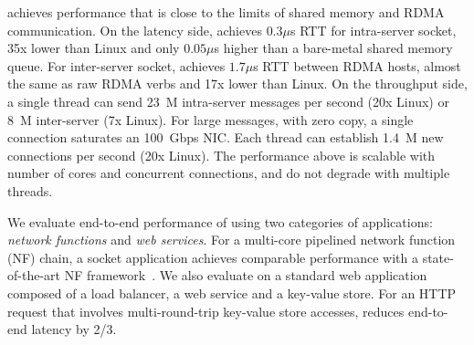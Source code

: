 \sys{} achieves performance that is close to the limits of shared memory and RDMA communication. On the latency side, \sys{} achieves $0.3\mu$s RTT for intra-server socket, 35x lower than Linux and only $0.05\mu$s higher than a bare-metal shared memory queue. For inter-server socket, \sys{} achieves $1.7\mu$s RTT between RDMA hosts, almost the same as raw RDMA verbs and 17x lower than Linux. On the throughput side, a single thread can send 23~M intra-server messages per second (20x Linux) or 8~M inter-server (7x Linux). For large messages, with zero copy, a single connection saturates an 100~Gbps NIC. Each thread can establish 1.4~M new connections per second (20x Linux). The performance above is scalable with number of cores and concurrent connections, and do not degrade with multiple threads.

We evaluate end-to-end performance of \sys{} using two categories of applications: \textit{network functions} and \textit{web services}. For a multi-core pipelined network function (NF) chain, a socket application achieves comparable performance with a state-of-the-art NF framework~\cite{panda2016netbricks}. We also evaluate \sys{} on a standard web application composed of a load balancer, a web service and a key-value store.
For an HTTP request that involves multi-round-trip key-value store accesses, \sys{} reduces end-to-end latency by 2/3.

